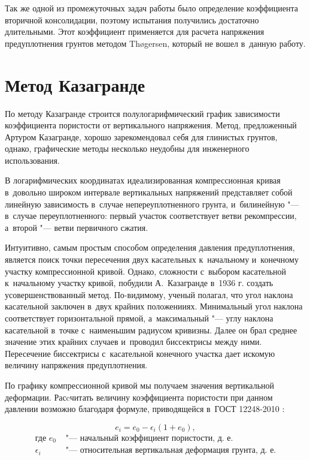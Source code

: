 Так же одной из промежуточных задач работы было определение коэффициента вторичной консолидации, поэтому испытания получились достаточно длительными. Этот коэффициент применяется для расчета напряжения предуплотнения грунтов методом Th{\o}gersen, который не вошел в~данную работу.


\section{Метод Казагранде}

По методу Казагранде строится полулогарифмический график зависимости коэффициента пористости от вертикального напряжения.  
Метод, предложенный Артуром Казагранде, хорошо зарекомендовал себя для глинистых грунтов, однако, графические методы несколько неудобны для инженерного использования.

В логарифмических координатах идеализированная компрессионная кривая в~довольно широком интервале вертикальных напряжений представляет собой линейную зависимость в~случае непереуплотненного грунта, и~билинейную "--- в~случае переуплотненного:
первый участок соответствует ветви рекомпрессии, а~второй "--- ветви первичного сжатия.

Интуитивно, самым простым способом определения давления предуплотнения, является поиск точки пересечения двух касательных к~начальному и~конечному участку компрессионной кривой. 
Однако, сложности с~выбором касательной к~начальному участку кривой, побудили А.~Казагранде в~1936 г. создать усовершенствованный метод. 
По-видимому, ученый полагал, что угол наклона касательной заключен в~двух крайних положенииях. 
Минимальный угол наклона соответствует горизонтальной прямой, а~максимальный "--- углу наклона касательной в~точке с~наименьшим радиусом кривизны. 
Далее он брал среднее значение этих крайних случаев и~проводил биссектрисы между ними. 
Пересечение биссектрисы с~касательной конечного участка дает искомую величину напряжения предуплотнения.

По графику компрессионной кривой мы получаем значения вертикальной деформации. Расcчитать величину коэффициента пористости при данном давлении возможно благодаря формуле, приводящейся в~ГОСТ 12248-2010 \cite{gost12248}:

\begin{equation}
  \label{eq:void}
  e_i = e_0 - \epsilon_i (1+e_0),
\end{equation}
\begin{align*}
  \text{где }
  e_0 & 
  \text{ "--- начальный коэффициент пористости, д.~е.} \\
  \epsilon_i & 
  \text{ "--- относительная вертикальная деформация грунта, д.~е.}
\end{align*}


